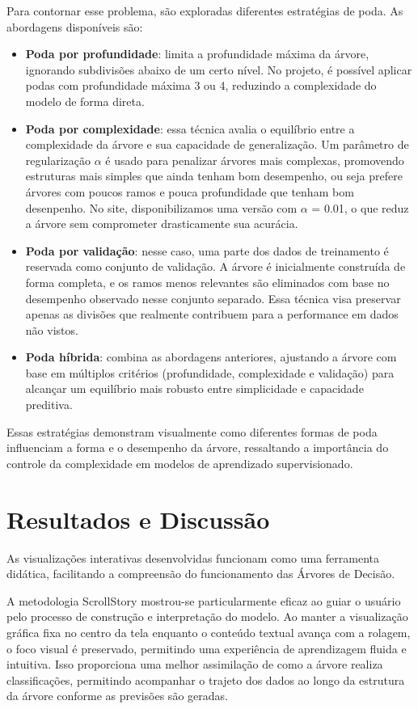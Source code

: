 \documentclass[conference]{IEEEtran}
\begin{document}
Para contornar esse problema, são exploradas diferentes estratégias de poda. As abordagens disponíveis são:
\begin{itemize}
    \item \textbf{Poda por profundidade}: limita a profundidade máxima da árvore, ignorando subdivisões abaixo de um certo nível. No projeto, é possível aplicar podas com profundidade máxima 3 ou 4, reduzindo a complexidade do modelo de forma direta.

\item \textbf{Poda por complexidade}: essa técnica avalia o equilíbrio entre a complexidade da árvore e sua capacidade de generalização. Um parâmetro de regularização $\alpha$ é usado para penalizar árvores mais complexas, promovendo estruturas mais simples que ainda tenham bom desempenho, ou seja prefere árvores com poucos ramos e pouca profundidade que tenham bom desenpenho. No site, disponibilizamos uma versão com $\alpha$ = 0.01, o que reduz a árvore sem comprometer drasticamente sua acurácia.

\item \textbf{Poda por validação}: nesse caso, uma parte dos dados de treinamento é reservada como conjunto de validação. A árvore é inicialmente construída de forma completa, e os ramos menos relevantes são eliminados com base no desempenho observado nesse conjunto separado. Essa técnica visa preservar apenas as divisões que realmente contribuem para a performance em dados não vistos.

\item \textbf{Poda híbrida}: combina as abordagens anteriores, ajustando a árvore com base em múltiplos critérios (profundidade, complexidade e validação) para alcançar um equilíbrio mais robusto entre simplicidade e capacidade preditiva.
\end{itemize}

Essas estratégias demonstram visualmente como diferentes formas de poda influenciam a forma e o desempenho da árvore, ressaltando a importância do controle da complexidade em modelos de aprendizado supervisionado.

\section{Resultados e Discussão}
As visualizações interativas desenvolvidas funcionam como uma ferramenta didática, facilitando a compreensão do funcionamento das Árvores de Decisão.

A metodologia ScrollStory mostrou-se particularmente eficaz ao guiar o usuário pelo processo de construção e interpretação do modelo. Ao manter a visualização gráfica fixa no centro da tela enquanto o conteúdo textual avança com a rolagem, o foco visual é preservado, permitindo uma experiência de aprendizagem fluida e intuitiva. Isso proporciona uma melhor assimilação de como a árvore realiza classificações, permitindo acompanhar o trajeto dos dados ao longo da estrutura da árvore conforme as previsões são geradas.
\end{document}

